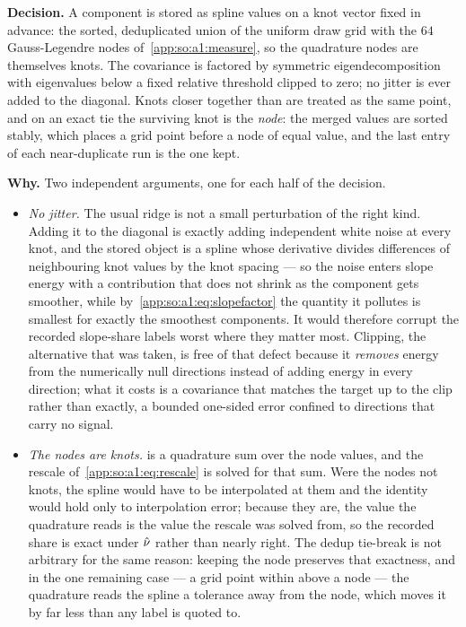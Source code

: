 \label{app:so:a4:d3}

\textbf{Decision.} A component is stored as spline values on a knot vector
fixed in advance: the sorted, deduplicated union of the uniform draw grid with
the $64$ Gauss-Legendre nodes of~\ref{app:so:a1:measure}, so the quadrature
nodes are themselves knots. The covariance is factored by symmetric
eigendecomposition with eigenvalues below a fixed relative threshold clipped to
zero; no jitter is ever added to the diagonal. Knots closer together than
 are treated as the same point, and on an exact tie
the surviving knot is the \emph{node}: the merged values are sorted stably,
which places a grid point before a node of equal value, and the last entry of
each near-duplicate run is the one kept.

\textbf{Why.} Two independent arguments, one for each half of the decision.

\begin{itemize}
  \item \emph{No jitter.} The usual ridge is not a small perturbation of the
    right kind. Adding it to the diagonal is exactly adding independent white
    noise at every knot, and the stored object is a spline whose derivative
    divides differences of neighbouring knot values by the knot spacing --- so
    the noise enters slope energy with a contribution that does not shrink as
    the component gets smoother, while by~\eqref{app:so:a1:eq:slopefactor} the
    quantity it pollutes is smallest for exactly the smoothest components. It
    would therefore corrupt the recorded slope-share labels worst where they
    matter most. Clipping, the alternative that was taken, is free of that
    defect because it \emph{removes} energy from the numerically null
    directions instead of adding energy in every direction; what it costs is a
    covariance that matches the target up to the clip rather than exactly, a
    bounded one-sided error confined to directions that carry no signal.
  \item \emph{The nodes are knots.}  is a quadrature
    sum over the node values, and the rescale
    of~\eqref{app:so:a1:eq:rescale} is solved for that sum. Were the nodes not
    knots, the spline would have to be interpolated at them and the identity
    would hold only to interpolation error; because they are, the value the
    quadrature reads is the value the rescale was solved from, so the recorded
    share is exact under $\hat\nu$ rather than nearly right. The dedup
    tie-break is not arbitrary for the same reason: keeping the node preserves
    that exactness, and in the one remaining case --- a grid point within
     above a node --- the quadrature reads the spline a
    tolerance away from the node, which moves it by far less than any label is
    quoted to.
\end{itemize}

